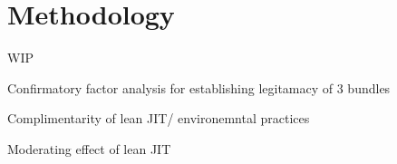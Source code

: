 \section{Methodology}
WIP  

Confirmatory factor analysis for establishing legitamacy of 3 bundles

Complimentarity of lean JIT/ environemntal practices

Moderating effect of lean JIT 

